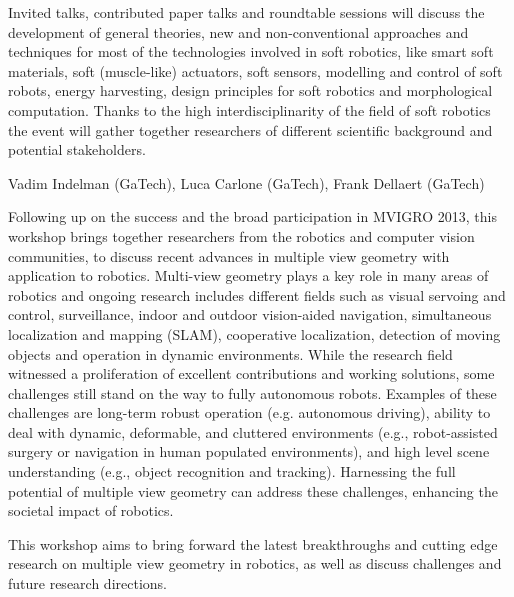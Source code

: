 \begin{spacing}{1.0}
{Invited talks, contributed paper talks and roundtable sessions will discuss the development of general theories, new and non-conventional approaches and techniques for most of the technologies involved in soft robotics, like smart soft materials, soft (muscle-like) actuators, soft sensors, modelling and control of soft robots, energy harvesting, design principles for soft robotics and morphological computation. Thanks to the high interdisciplinarity of the field of soft robotics the event will gather together researchers of different scientific background and potential stakeholders.
}

{Vadim Indelman (GaTech), Luca Carlone (GaTech), Frank Dellaert (GaTech)}
{
Following up on the success and the broad participation in MVIGRO 2013, this workshop brings together researchers from the robotics and computer vision communities, to discuss recent advances in multiple view geometry with application to robotics. Multi-view geometry plays a key role in many areas of robotics and ongoing research includes different fields such as visual servoing and control, surveillance, indoor and outdoor vision-aided navigation, simultaneous localization and mapping (SLAM), cooperative localization, detection of moving objects and operation in dynamic environments. While the research field witnessed a proliferation of excellent contributions and working solutions, some challenges still stand on the way to fully autonomous robots. Examples of these challenges are long-term robust operation (e.g. autonomous driving), ability to deal with dynamic, deformable, and cluttered environments (e.g., robot-assisted surgery or navigation in human populated environments), and high level scene understanding (e.g., object recognition and tracking). Harnessing the full potential of multiple view geometry can address these challenges, enhancing the societal impact of robotics. 

This workshop aims to bring forward the latest breakthroughs and cutting edge research on multiple view geometry in robotics, as well as discuss challenges and future research directions. 
}



\end{spacing}
